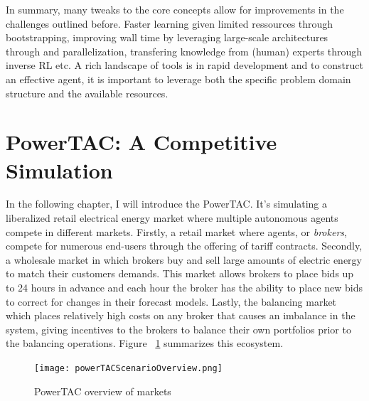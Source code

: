 In summary, many tweaks to the core concepts allow for improvements in the challenges outlined before. Faster learning given limited
ressources through bootstrapping, improving wall time by leveraging large-scale architectures through and
parallelization, transfering knowledge from (human) experts through inverse \ac {RL} etc. A rich landscape of tools is
in rapid development and to construct an effective agent, it is important to leverage both the specific problem domain
structure and the available resources. 



\section{PowerTAC: A Competitive Simulation}

In the following chapter, I will introduce the \acf{PowerTAC}. It's simulating a liberalized retail electrical energy
market where multiple autonomous agents compete in different markets. Firstly, a retail market where agents, or
\emph{brokers}, compete for numerous end-users through the offering of tariff contracts. Secondly, a wholesale market in
which brokers buy and sell large amounts of electric energy to match their customers demands. This market allows brokers
to place bids up to 24 hours in advance and each hour the broker has the ability to place new bids to correct for
changes in their forecast models. Lastly, the balancing market which places relatively high costs on any broker that
causes an imbalance in the system, giving incentives to the brokers to balance their own portfolios prior to the
balancing operations. Figure ~\ref{fig:powertacoverview} summarizes this ecosystem.


\begin{figure}[!h]%
    \texttt{[image: powerTACScenarioOverview.png]} \caption{PowerTAC overview of markets}
\label{fig:powertacoverview} \end{figure}


